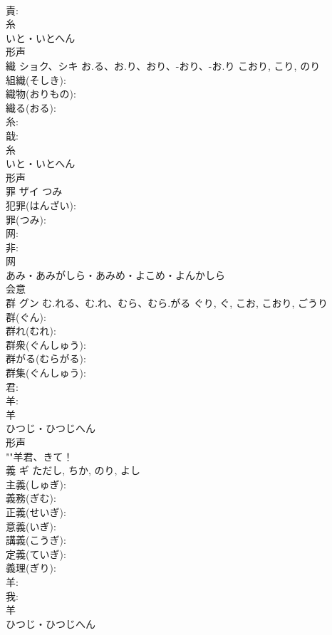 \documentclass[8pt]{extreport}
\begin{document}
\begin{CJK}{UTF8}{min}
\\	責: 
\\	糸	
\\	いと・いとへん	
\\	形声 
\\	織	ショク、シキ	お.る、お.り、おり、-おり、-お.り	こおり, こり, のり	
\\	組織(そしき): 
\\	織物(おりもの): 
\\	織る(おる): 
\\	糸: 
\\	戠: 
\\	糸	
\\	いと・いとへん	
\\	形声 
\\	罪	ザイ	つみ		
\\	犯罪(はんざい): 
\\	罪(つみ): 
\\	网: 
\\	非: 
\\	网	
\\	あみ・あみがしら・あみめ・よこめ・よんかしら	
\\	会意 
\\	群	グン	む.れる、む.れ、むら、むら.がる	ぐり, ぐ, こお, こおり, ごうり	
\\	群(ぐん): 
\\	群れ(むれ): 
\\	群衆(ぐんしゅう): 
\\	群がる(むらがる): 
\\	群集(ぐんしゅう): 
\\	君: 
\\	羊: 
\\	羊	
\\	ひつじ・ひつじへん	
\\	形声 
\\	""羊君、きて！
\\	義	ギ		ただし, ちか, のり, よし	
\\	主義(しゅぎ): 
\\	義務(ぎむ): 
\\	正義(せいぎ): 
\\	意義(いぎ): 
\\	講義(こうぎ): 
\\	定義(ていぎ): 
\\	義理(ぎり): 
\\	羊: 
\\	我: 
\\	羊	
\\	ひつじ・ひつじへん	

\end{CJK}
\end{document}
